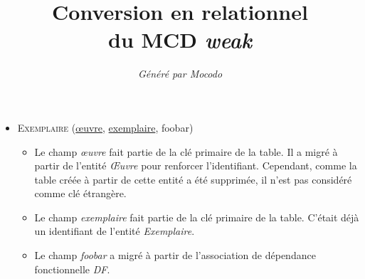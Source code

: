 \documentclass[a4paper]{article}
\title{Conversion en relationnel\\du MCD \emph{weak}}
\author{\emph{Généré par Mocodo}}
\newcommand{\relat}[1]{\textsc{#1}}
\newcommand{\attr}[1]{#1}
\newcommand{\prim}[1]{\uline{#1}}
\begin{document}
\maketitle

\begin{itemize}
  \item \relat{Exemplaire} (\prim{œuvre}, \prim{exemplaire}, \attr{foobar})
  \begin{itemize}
    \item Le champ \emph{œuvre} fait partie de la clé primaire de la table. Il a migré à partir de l'entité \emph{Œuvre} pour renforcer l'identifiant. Cependant, comme la table créée à partir de cette entité a été supprimée, il n'est pas considéré comme clé étrangère.
    \item Le champ \emph{exemplaire} fait partie de la clé primaire de la table. C'était déjà un identifiant de l'entité \emph{Exemplaire}.
    \item Le champ \emph{foobar} a migré à partir de l'association de dépendance fonctionnelle \emph{DF}.
  \end{itemize}

\end{itemize}
\end{document}
